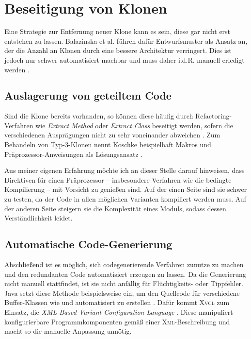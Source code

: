 \section{Beseitigung von Klonen}

Eine Strategie zur Entfernung neuer Klone kann es sein, diese gar nicht erst entstehen zu lassen. Balazinska et al. \cite{balazinska2000advanced} führen dafür Entwurfsmuster als Ansatz an, der die Anzahl an Klonen durch eine bessere Architektur verringert. Dies ist jedoch nur schwer automatisiert machbar und muss daher i.d.R. manuell erledigt werden \cite{koschke2007survey}.


\subsection{Auslagerung von geteiltem Code}

Sind die Klone bereits vorhanden, so können diese häufig durch Refactoring-Verfahren wie \textit{Extract Method} oder \textit{Extract Class} beseitigt werden, sofern die verschiedenen Ausprägungen nicht zu sehr voneinander abweichen \cite{fanta1999removing}. Zum Behandeln von Typ-3-Klonen nennt Koschke beispielhaft Makros und Präprozessor-Anweisungen als Lösungsansatz \cite{koschke2007survey}.

Aus meiner eigenen Erfahrung möchte ich an dieser Stelle darauf hinweisen, dass Direktiven für einen Präprozessor -- insbesondere Verfahren wie die bedingte Kompilierung -- mit Vorsicht zu genießen sind. Auf der einen Seite sind sie schwer zu testen, da der Code in allen möglichen Varianten kompiliert werden muss. Auf der anderen Seite steigern sie die Komplexität eines Moduls, sodass dessen Verständlichkeit leidet.


\subsection{Automatische Code-Generierung}

Abschließend ist es möglich, sich codegenerierende Verfahren zunutze zu machen und den redundanten Code automatisiert erzeugen zu lassen. Da die Generierung nicht manuell stattfindet, ist sie nicht anfällig für Flüchtigkeits- oder Tippfehler. Java setzt diese Methode beispielsweise ein, um den Quellcode für verschiedene Buffer-Klassen wie  und  automatisiert zu erstellen \cite{koschke2013Similarity}. Dafür kommt \textsc{Xvcl} zum Einsatz, die \textit{XML-Based Variant Configuration Language} \cite{XVCL}. Diese manipuliert konfigurierbare Programmkomponenten gemäß einer \textsc{Xml}-Beschreibung und macht so die manuelle Anpassung unnötig.



